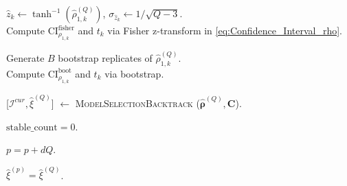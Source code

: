 \begin{algorithm}[!ht]
{{{            $\widehat{z}_k \gets \tanh^{-1}(\widehat{\rho}_{1,k}^{(Q)})$, $\sigma_{\widehat{z}_k} \gets 1/\sqrt{Q - 3}$. \\
            Compute $\text{CI}_{\rho_{1,k}}^{\text{fisher}}$ and $t_k$ via Fisher z-transform in \eqref{eq:Confidence_Interval_rho}.
        
    }{
        
            Generate $B$ bootstrap replicates of $\widehat{\rho}_{1,k}^{(Q)}$.  \\
            Compute $\text{CI}_{\rho_{1,k}}^{\text{boot}}$ and $t_k$ via bootstrap.
        
    }

    
    }

    [$\mathcal{I}^{cur},\widehat{\xi}^{(Q)}$] $\gets$ \textsc{ModelSelectionBacktrack} ($\widehat{\boldsymbol{\rho}}^{(Q)},\boldsymbol{C}$).\\

    {
            $\text{stable}\_\text{count} = 0$.
    
        $p=p+dQ$. 
        
        $\widehat{\xi}^{(p)} = \widehat{\xi}^{(Q)}$.
    }
    


    
}
\end{algorithm}
